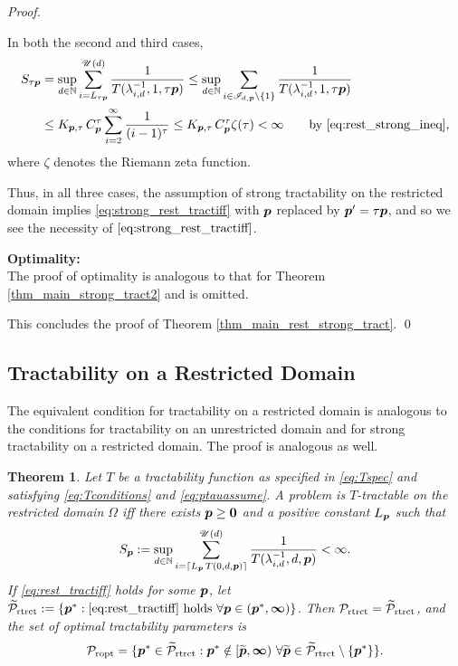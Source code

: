\documentclass[sort&compress]{elsarticle}
\newcommand{\theUB}{\mathscr{U}}
\newtheorem{theorem}{Theorem}
\begin{document}
\begin{proof}
\begin{enumerate}
\bigskip

In both the second and third cases,
\begin{align*}
S_{\tau\vp} & = \sup_{d\in\naturals} \sum_{i = L_{\tau\vp}}^{\theUB(d)} \frac{1}{T (\lambda_{i,d}^{-1},1, \tau \vp)}
\le
\sup_{d\in\naturals} \sum_{i \in \mathscr{I}_{d,\vp} \setminus\{1\} } \frac{1}{T (\lambda_{i,d}^{-1},1, \tau \vp)} \\
&  \le  K_{\vp,\tau}\, C_{\vp}^\tau
\sum_{i=2}^\infty \frac{1}{(i-1)^\tau}
 \le K_{\vp,\tau}\, C_{\vp}^\tau
\zeta (\tau)
 < \infty \qquad \text{by \eqref{eq:rest_strong_ineq},}
\end{align*}
where $\zeta$ denotes the Riemann zeta function.

\end{enumerate}
Thus, in all three cases, the assumption of strong tractability on the restricted domain implies \eqref{eq:strong_rest_tractiff} with $\boldsymbol{p}$ replaced by $\boldsymbol{p}' = \tau \boldsymbol{p}$, and so we see the necessity of $\eqref{eq:strong_rest_tractiff}$.

\bigskip
\noindent \textbf{Optimality:} \\
The proof of optimality is analogous to that for Theorem \ref{thm_main_strong_tract2} and is omitted.

\bigskip

\noindent This concludes the proof of  Theorem \ref{thm_main_rest_strong_tract}.  \qed
\end{proof}

\subsection{Tractability on a Restricted Domain}


The equivalent condition for tractability on a restricted domain is analogous to the conditions for tractability on an unrestricted domain and for strong tractability on a restricted domain.  The proof is analogous as well.

\begin{theorem}\label{thm_main_rest_tract}
Let $T$ be a tractability function as specified in \eqref{eq:Tspec} and satisfying \eqref{eq:Tconditions} and \eqref{eq:ptauassume}.  A problem is $T$-tractable on the restricted domain $\Omega$ iff there exists $\boldsymbol{p}\ge \boldsymbol{0}$ and a positive constant $L_{\boldsymbol{p}}$ such that
\begin{equation} \label{eq:rest_tractiff}
     S_{\vp}:=\sup_{d \in \naturals}
     \sum_{i = \lceil L_{\vp}\, T(0,d,\vp) \rceil}^{\theUB(d)} \frac{1}{T(\lambda^{-1}_{i,d},d,\vp)}< \infty.
\end{equation}
If \eqref{eq:rest_tractiff} holds for some $\boldsymbol{p}$, let $\widetilde{\mathcal{P}}_{\textup{rtrct}} : = \{\boldsymbol{p}^* : \eqref{eq:rest_tractiff} \text{ holds }\forall \boldsymbol{p} \in (\boldsymbol{p}^*,\boldsymbol{\infty}) \}$.
Then $\mathcal{P}_{\textup{rtrct}} = \widetilde{\mathcal{P}}_{\textup{rtrct}}$, and the set of optimal  tractability parameters is
\[
\mathcal{P}_{\textup{ropt}} =
\{\boldsymbol{p}^* \in \widetilde{\mathcal{P}}_{\textup{rtrct}} :  \boldsymbol{p}^* \notin [\widetilde{\boldsymbol{p}},\boldsymbol{\infty}) \ \forall \widetilde{\boldsymbol{p}}\in  \widetilde{\mathcal{P}}_{\textup{rtrct}} \setminus \{\boldsymbol{p}^*\} \}.
\]
\end{theorem}
\end{document}
